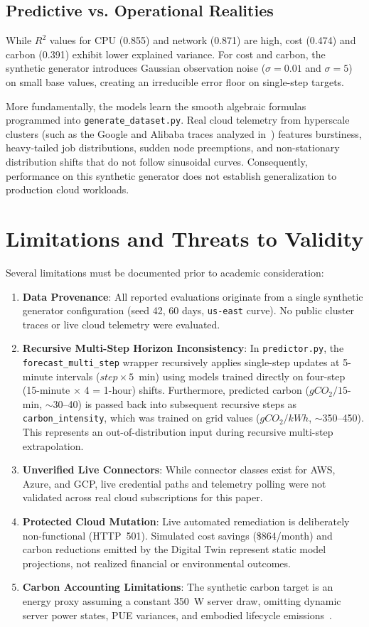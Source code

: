 \documentclass[conference]{IEEEtran}
\begin{document}
\subsection{Predictive vs. Operational Realities}
While $R^2$ values for CPU (0.855) and network (0.871) are high, cost (0.474) and carbon (0.391) exhibit lower explained variance. For cost and carbon, the synthetic generator introduces Gaussian observation noise ($\sigma = 0.01$ and $\sigma = 5$) on small base values, creating an irreducible error floor on single-step targets.

More fundamentally, the models learn the smooth algebraic formulas programmed into \texttt{generate\_dataset.py}. Real cloud telemetry from hyperscale clusters (such as the Google and Alibaba traces analyzed in~\cite{r3}) features burstiness, heavy-tailed job distributions, sudden node preemptions, and non-stationary distribution shifts that do not follow sinusoidal curves. Consequently, performance on this synthetic generator does not establish generalization to production cloud workloads.

\section{Limitations and Threats to Validity}
Several limitations must be documented prior to academic consideration:
\begin{enumerate}
    \item \textbf{Data Provenance}: All reported evaluations originate from a single synthetic generator configuration (seed 42, 60 days, \texttt{us-east} curve). No public cluster traces or live cloud telemetry were evaluated.
    \item \textbf{Recursive Multi-Step Horizon Inconsistency}: In \texttt{predictor.py}, the \texttt{forecast\_multi\_step} wrapper recursively applies single-step updates at 5-minute intervals ($step \times 5$~min) using models trained directly on four-step (15-minute $\times$ 4 = 1-hour) shifts. Furthermore, predicted carbon ($gCO_2/15$-min, $\sim$30--40) is passed back into subsequent recursive steps as \texttt{carbon\_intensity}, which was trained on grid values ($gCO_2/kWh$, $\sim$350--450). This represents an out-of-distribution input during recursive multi-step extrapolation.
    \item \textbf{Unverified Live Connectors}: While connector classes exist for AWS, Azure, and GCP, live credential paths and telemetry polling were not validated across real cloud subscriptions for this paper.
    \item \textbf{Protected Cloud Mutation}: Live automated remediation is deliberately non-functional (HTTP~501). Simulated cost savings (\$864/month) and carbon reductions emitted by the Digital Twin represent static model projections, not realized financial or environmental outcomes.
    \item \textbf{Carbon Accounting Limitations}: The synthetic carbon target is an energy proxy assuming a constant 350~W server draw, omitting dynamic server power states, PUE variances, and embodied lifecycle emissions~\cite{r5}.
\end{enumerate}
\end{document}
